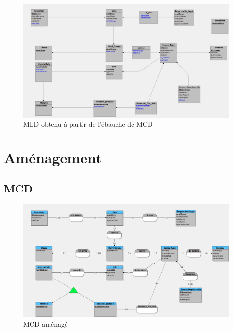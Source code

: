 \documentclass[12pt,french,titlepage]{article}
\begin{document}
    \begin{figure}[H]
	      \centering
	      \includegraphics[scale=0.23]{./ebauche_mld.jpg}
	      \caption{MLD obtenu à partir de l'ébauche de MCD}
	      
	   
	      
	  \end{figure}
    
    \section{Aménagement}
    
    \subsection{MCD}
    
    \begin{figure}[H]
	      \centering
	      \includegraphics[scale=0.1]{./mcd_amenage.jpg}
	      \caption{MCD aménagé}
	      
	   
	      
	  \end{figure}
	  
\end{document}
